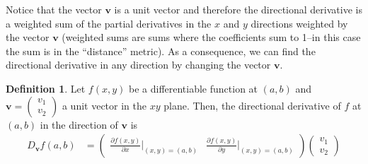 \documentclass[
]{book}
\theoremstyle{definition}
\newtheorem{definition}{Definition}[chapter]
\theoremstyle{definition}
\theoremstyle{definition}
\theoremstyle{definition}
\theoremstyle{remark}
\begin{document}
Notice that the vector \(\mathbf{v}\) is a unit vector and therefore the directional derivative is a weighted sum of the partial derivatives in the \(x\) and \(y\) directions weighted by the vector \(\mathbf{v}\) (weighted sums are sums where the coefficients sum to 1--in this case the sum is in the ``distance'' metric). As a consequence, we can find the directional derivative in any direction by changing the vector \(\mathbf{v}\).

\begin{definition}
\protect\hypertarget{def:directional-gradient}{}\label{def:directional-gradient}Let \(f(x, y)\) be a differentiable function at \((a, b)\) and \(\mathbf{v} = \begin{pmatrix} v_1 \\ v_2 \end{pmatrix}\) a unit vector in the \(xy\) plane. Then, the directional derivative of \(f\) at \((a, b)\) in the direction of \(\mathbf{v}\) is
\[
\begin{aligned}
D_{\mathbf{v}} f(a, b) & = \begin{pmatrix} \frac{\partial f(x, y)}{\partial x}|_{(x,y) = (a, b)} & \frac{\partial f(x, y)}{\partial y}|_{(x,y) = (a, b)} \end{pmatrix} \begin{pmatrix} v_1 \\ v_2 \end{pmatrix} \\
\end{aligned}
\]
\end{definition}
\end{document}
